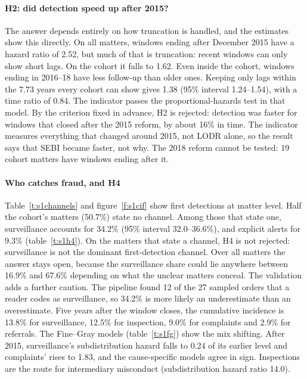 \documentclass[letterpaper,11pt,leqno]{article}
\begin{document}
\paragraph{H2: did detection speed up after 2015?} The answer depends entirely on how truncation is handled, and the estimates show this directly. On all matters, windows ending after December 2015 have a hazard ratio of 2.52, but much of that is truncation: recent windows can only show short lags. On the cohort it falls to 1.62. Even inside the cohort, windows ending in 2016--18 have less follow-up than older ones. Keeping only lags within the 7.73 years every cohort can show gives 1.38 (95\% interval 1.24--1.54), with a time ratio of 0.84. The indicator passes the proportional-hazards test in that model. By the criterion fixed in advance, H2 is rejected: detection was faster for windows that closed after the 2015 reform, by about 16\% in time. The indicator measures everything that changed around 2015, not LODR alone, so the result says that SEBI became faster, not why. The 2018 reform cannot be tested: 19 cohort matters have windows ending after it.

\paragraph{Who catches fraud, and H4} Table~\ref{t:s1channels} and figure~\ref{f:s1cif} show first detections at matter level. Half the cohort's matters (50.7\%) state no channel. Among those that state one, surveillance accounts for 34.2\% (95\% interval 32.0--36.6\%), and explicit alerts for 9.3\% (table~\ref{t:s1h4}). On the matters that state a channel, H4 is not rejected: surveillance is not the dominant first-detection channel. Over all matters the answer stays open, because the surveillance share could lie anywhere between 16.9\% and 67.6\% depending on what the unclear matters conceal. The validation adds a further caution. The pipeline found 12 of the 27 sampled orders that a reader codes as surveillance, so 34.2\% is more likely an underestimate than an overestimate. Five years after the window closes, the cumulative incidence is 13.8\% for surveillance, 12.5\% for inspection, 9.0\% for complaints and 2.9\% for referrals. The Fine--Gray models (table~\ref{t:s1fg}) show the mix shifting. After 2015, surveillance's subdistribution hazard falls to 0.24 of its earlier level and complaints' rises to 1.83, and the cause-specific models agree in sign. Inspections are the route for intermediary misconduct (subdistribution hazard ratio 14.0).
\end{document}
